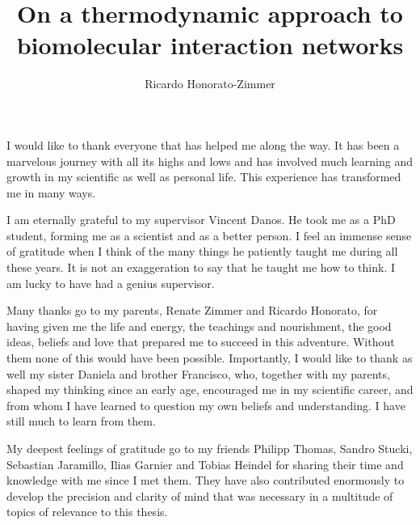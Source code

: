 \documentclass[phd,lfcs]{infthesis}
\title{On a thermodynamic approach to
  biomolecular interaction networks}
\author{Ricardo Honorato-Zimmer}
\begin{document}
\begin{preliminary}

\maketitle


\begin{acknowledgements}
  \vspace{.1cm}
  I would like to thank everyone that has helped me along the way.
  It has been a marvelous journey with all its highs and lows
  and has involved much learning and growth
  in my scientific as well as personal life.
  This experience has transformed me in many ways.

  I am eternally grateful to my supervisor Vincent Danos.
  He took me as a PhD student,
  forming me as a scientist and as a better person.
  I feel an immense sense of gratitude
  when I think of the many things
  he patiently taught me during all these years.
  It is not an exaggeration to say that he taught me how to think.
  I am lucky to have had a genius supervisor.

  Many thanks go to my parents,
  Renate Zimmer and Ricardo Honorato,
  for having given me the life and energy,
  the teachings and nourishment,
  the good ideas, beliefs and love that
  prepared me to succeed in this adventure.
  Without them none of this would have been possible.
  Importantly, I would like to thank as well
  my sister Daniela and brother Francisco,
  who, together with my parents,
  shaped my thinking since an early age,
  encouraged me in my scientific career,
  and from whom I have learned to question
  my own beliefs and understanding.
  I have still much to learn from them.

  My deepest feelings of gratitude go %
  to my friends Philipp Thomas, Sandro Stucki,
  Sebastian Jaramillo, Ilias Garnier and Tobias Heindel
  for sharing their time and knowledge
  with me since I met them. %
  They have also contributed enormously
  to develop the precision and clarity of mind
  that was necessary
  in a multitude of topics of relevance to this thesis.


\end{acknowledgements}
\end{preliminary}
\end{document}
